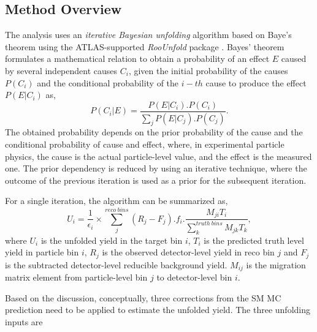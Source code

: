 \subsection{Method Overview}
\label{subsec:UnfoldingOverview}
The analysis uses an \textit{iterative Bayesian unfolding} algorithm based on Baye's theorem \cite{BayesianUnfolding} \cite{Improved_BayesianUnfolding} using the ATLAS-supported \textit{RooUnfold} package \cite{RooUnfold}. Bayes' theorem formulates a mathematical relation to obtain a probability of an effect $E$ caused by several independent causes $C_{i}$, given the initial probability of the causes $P(C_{i})$ and the conditional probability of the $i-th$ cause to produce the effect $P(E|C_{i})$ as, 
\begin{equation}
P(C_{i}|E) = \frac{ P(E|C_{i}) . P(C_{i}) } { \sum_{j}{ P(E|C_{j}).P(C_{j}) } }.
\label{eqn:BayesTheorem}
\end{equation}
The obtained probability depends on the prior probability of the cause and the conditional probability of cause and effect, where, in experimental particle physics, the cause is the actual particle-level value, and the effect is the measured one. The prior dependency is reduced by using an iterative technique, where the outcome of the previous iteration is used as a prior for the subsequent iteration.

For a single iteration, the algorithm can be summarized as, 
\begin{equation}
    U_{i} = \frac{1}{ \epsilon_{i} } \times \sum^{reco~bins}_{j}{ (R_j -F_j ) . f_{i} . \frac{M_{ji} T_{i}}{ \sum_{k}^{truth~bins}{M_{jk} T_{k}}} },
    \label{eqn:BayesianUnfolding}
\end{equation}
where $U_{i}$ is the unfolded yield in the target bin $i$, $T_{i}$ is the predicted truth level yield in particle bin $i$, $R_{j}$ is the observed detector-level yield in reco bin $j$ and $F_{j}$ is the subtracted detector-level reducible background yield. $M_{ij}$ is the migration matrix element from particle-level bin $j$ to detector-level bin $i$. 

Based on the discussion, conceptually, three corrections from the SM MC prediction need to be applied to estimate the unfolded yield. The three unfolding inputs are 

